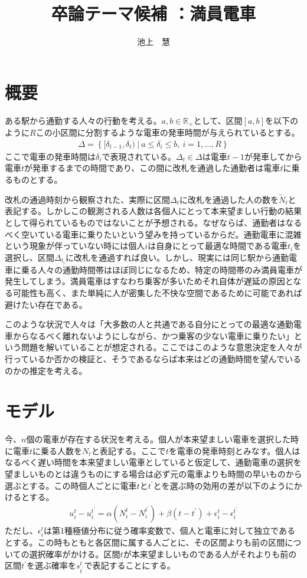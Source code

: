 \documentclass{jsarticle}
\begin{document}
\title{卒論テーマ候補 ：満員電車}
\author{池上　慧}
\maketitle

\section{概要}
ある駅から通勤する人々の行動を考える。$a,b\in \mathbb{R}_{+}$として、区間$[a, b]$を以下のように$R$この小区間に分割するような電車の発車時間が与えられているとする。
\begin{align*}
	\Delta = \left\{ [\delta_{t-1}, \delta_t)\ |\ a \leq \delta_i \leq b,\ i = 1, \dots, R \right\}
\end{align*}
ここで電車の発車時間は$\delta_i$で表現されている。$\Delta_t \in \Delta$は電車$t-1$が発車してから電車$t$が発車するまでの時間であり、この間に改札を通過した通勤者は電車$t$に乗るものとする。

改札の通過時刻から観察された、実際に区間$\Delta_t$に改札を通過した人の数を$\tilde{N}_t$と表記する。しかしこの観測される人数は各個人にとって本来望ましい行動の結果として得られているものではないことが予想される。なぜならば、通勤者はなるべく空いている電車に乗りたいという望みを持っているからだ。通勤電車に混雑という現象が伴っていない時には個人$i$は自身にとって最適な時間である電車$t_i$を選択し、区間$\Delta_{t_i}$に改札を通過すれば良い。しかし、現実には同じ駅から通勤電車に乗る人々の通勤時間帯はほぼ同じになるため、特定の時間帯のみ満員電車が発生してしまう。満員電車はすなわち乗客が多いためそれ自体が遅延の原因となる可能性も高く、また単純に人が密集した不快な空間であるために可能であれば避けたい存在である。

このような状況で人々は「大多数の人と共通である自分にとっての最適な通勤電車からなるべく離れないようにしながら、かつ乗客の少ない電車に乗りたい」という問題を解いていることが想定される。ここではこのような意思決定を人々が行っているか否かの検証と、そうであるならば本来はどの通勤時間を望んでいるのかの推定を考える。

\section{モデル}
今、$n$個の電車が存在する状況を考える。個人が本来望ましい電車を選択した時に電車$t$に乗る人数を$N_t$と表記する。ここで$t$を電車の発車時刻とみなす。個人はなるべく遅い時間を本来望ましい電車としていると仮定して、通勤電車の選択を望ましいものとは違うものにする場合は必ず元の電車よりも時間の早いものから選ぶとする。この時個人ごとに電車$t$と$t^{'}$とを選ぶ時の効用の差が以下のようにかけるとする。
\begin{align*}
	u_i^t - u_i^{t^{'}} = \alpha(N_i^t - N_i^{t^{'}}) + \beta(t - t^{'}) + \epsilon_i^t - \epsilon_i^{t^{'}}
\end{align*}
ただし、$\epsilon_i^t$は第1種極値分布に従う確率変数で、個人と電車に対して独立であるとする。この時もともと各区間に属する人ごとに、その区間よりも前の区間についての選択確率がかける。区間$t$が本来望ましいものである人がそれよりも前の区間$t^{'}$を選ぶ確率を$s_{t^{'}}^t$で表記することにする。
\end{document}
